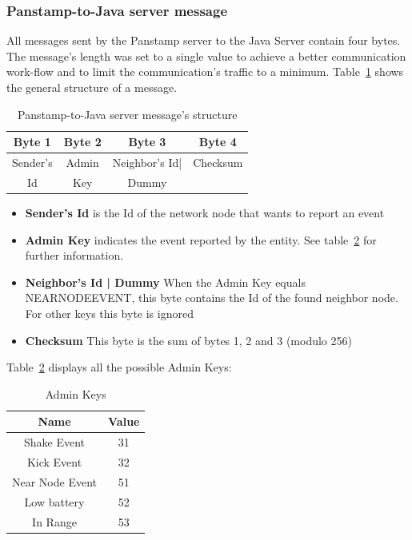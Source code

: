 \subsubsection{Panstamp-to-Java server message}
\label{sec:Panstamp-to-Java server message}
All messages sent by the Panstamp server to the Java Server contain four bytes. The message's length was set to a single value to achieve a better communication work-flow and to limit the communication's traffic to a minimum. Table~\ref{Panstamp-to-Java} shows the general structure of a message.


\begin{table}[h]
  \centering
  \begin{tabular}{ c | c | c | c }
    \hline
    \textbf{Byte 1} & \textbf{Byte 2} & \textbf{Byte 3} & \textbf{Byte 4} \\ [0.5ex]    
    \hline
    Sender's & Admin & Neighbor's Id| & Checksum  \\
    Id & Key & Dummy & \\
    \hline
  \end{tabular}
  \caption[Pamstamp-to-Java]%
          {Panstamp-to-Java server message's structure}
  \label{Panstamp-to-Java}
\end{table}

\begin{itemize}
\item \textbf{Sender's Id} is the Id of the network node that wants to report an event
\item \textbf{Admin Key} indicates the event reported by the entity. See table~\ref{Admin Keys} for further information.
\item \textbf {Neighbor's Id | Dummy } When the Admin Key equals NEARNODEEVENT, this byte contains the Id of the found neighbor node. For other keys this byte is ignored
\item \textbf {Checksum} This byte is the sum of bytes 1, 2 and 3 (modulo 256)
\end{itemize}

Table~\ref{Admin Keys} displays all the possible Admin Keys:

\begin{table}[h]
  \centering
  \begin{tabular}{ c | c }
    \hline
    \textbf{Name} & \textbf{Value}\\ [0.5ex]    
    \hline
    Shake Event & 31 \\
    Kick Event  & 32 \\
    Near Node Event & 51\\
    Low battery & 52\\
    In Range & 53\\   
    \hline
  \end{tabular}
  \caption[Admin Keys]%
          {Admin Keys}
  \label{Admin Keys}
\end{table}

